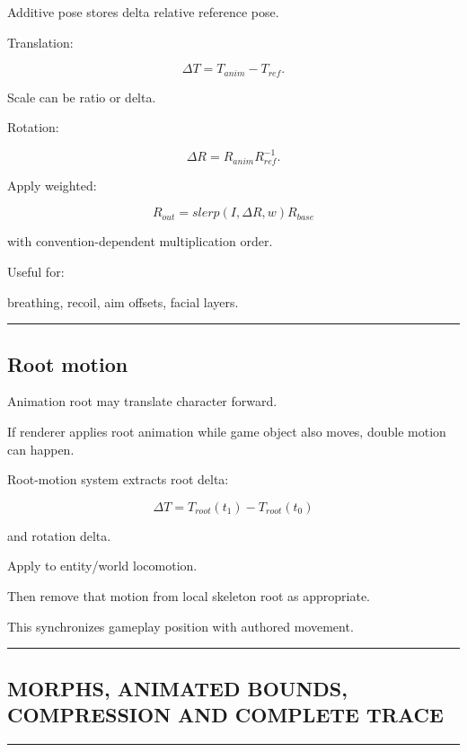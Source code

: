 Additive pose stores delta relative reference pose.

Translation:

\[
\Delta T=
T_{anim}-T_{ref}.
\]

Scale can be ratio or delta.

Rotation:

\[
\Delta R=
R_{anim}R_{ref}^{-1}.
\]

Apply weighted:

\[
R_{out}
=
slerp(
I,
\Delta R,
w
)
R_{base}
\]

with convention-dependent multiplication order.

Useful for:

breathing, recoil, aim offsets, facial layers.

\begin{center}\rule{0.5\linewidth}{0.5pt}\end{center}

\subsection{Root motion}\label{04-visual-computing-ii-ch041-root-motion}

Animation root may translate character forward.

If renderer applies root animation while game object also moves, double motion can happen.

Root-motion system extracts root delta:

\[
\Delta T=
T_{root}(t_1)
-
T_{root}(t_0)
\]

and rotation delta.

Apply to entity/world locomotion.

Then remove that motion from local skeleton root as appropriate.

This synchronizes gameplay position with authored movement.

\begin{center}\rule{0.5\linewidth}{0.5pt}\end{center}

\subsection{MORPHS, ANIMATED BOUNDS, COMPRESSION AND COMPLETE TRACE}\label{04-visual-computing-ii-ch041-morphs-animated-bounds-compression-and-complete-trace}

\begin{center}\rule{0.5\linewidth}{0.5pt}\end{center}


